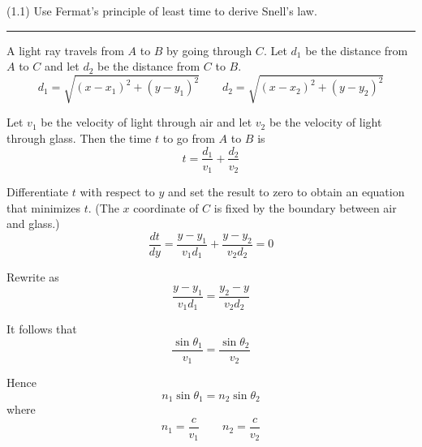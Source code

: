 \documentclass[12pt]{article}
\begin{document}
(1.1)
Use Fermat's principle of least time to derive Snell's law.

\bigskip
\hrule

\begin{center}
\end{center}

A light ray travels from $A$ to $B$ by going through $C$.
Let $d_1$ be the distance from $A$ to $C$ and let $d_2$ be the distance from $C$ to $B$.
\begin{equation*}
d_1=\sqrt{(x-x_1)^2+(y-y_1)^2}\qquad
d_2=\sqrt{(x-x_2)^2+(y-y_2)^2}
\end{equation*}

Let $v_1$ be the velocity of light through air and let $v_2$ be the velocity of light through glass.
Then the time $t$ to go from $A$ to $B$ is
\begin{equation*}
t=\frac{d_1}{v_1}+\frac{d_2}{v_2}
\end{equation*}

Differentiate $t$ with respect to $y$ and set the result to zero to obtain an equation that minimizes $t$.
(The $x$ coordinate of $C$ is fixed by the boundary between air and glass.)
\begin{equation*}
\frac{dt}{dy}=\frac{y-y_1}{v_1d_1}+\frac{y-y_2}{v_2d_2}=0
\end{equation*}

Rewrite as
\begin{equation*}
\frac{y-y_1}{v_1d_1}=\frac{y_2-y}{v_2d_2}
\end{equation*}

It follows that
\begin{equation*}
\frac{\sin\theta_1}{v_1}=\frac{\sin\theta_2}{v_2}
\end{equation*}

Hence
\begin{equation*}
n_1\sin\theta_1=n_2\sin\theta_2
\end{equation*}
where
\begin{equation*}
n_1=\frac{c}{v_1}\qquad n_2=\frac{c}{v_2}
\end{equation*}
\end{document}
